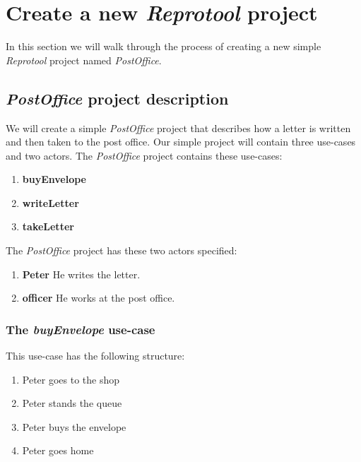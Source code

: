 \section{Create a new \emph{Reprotool} project}

In this section we will walk through the process of creating a new simple \emph{Reprotool} project named \emph{PostOffice}.

\subsection{\emph{PostOffice} project description}
We will create a simple \emph{PostOffice} project that describes how a letter is written and then taken to the post office.
Our simple project will contain three use-cases and two actors. The \emph{PostOffice} project contains these use-cases:

\begin{enumerate}
 \item {\bf buyEnvelope}
 \item {\bf writeLetter}
 \item {\bf takeLetter}
\end{enumerate}

The \emph{PostOffice} project has these two actors specified:

\begin{enumerate}
 \item {\bf Peter} He writes the letter.
 \item {\bf officer} He works at the post office.
\end{enumerate}

\subsubsection{The \emph{buyEnvelope} use-case}

This use-case has the following structure:

\begin{enumerate}
 \item Peter goes to the shop
 \item Peter stands the queue
 \item Peter buys the envelope
 \item Peter goes home
\end{enumerate}

